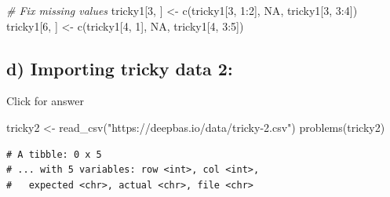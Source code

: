 \documentclass[
]{book}
\newenvironment{Shaded}{\begin{snugshade}}{\end{snugshade}}
\newcommand{\CommentTok}[1]{\textcolor[rgb]{0.56,0.35,0.01}{\textit{#1}}}
\newcommand{\ConstantTok}[1]{\textcolor[rgb]{0.00,0.00,0.00}{#1}}
\newcommand{\DecValTok}[1]{\textcolor[rgb]{0.00,0.00,0.81}{#1}}
\newcommand{\FunctionTok}[1]{\textcolor[rgb]{0.00,0.00,0.00}{#1}}
\newcommand{\NormalTok}[1]{#1}
\newcommand{\OtherTok}[1]{\textcolor[rgb]{0.56,0.35,0.01}{#1}}
\newcommand{\SpecialCharTok}[1]{\textcolor[rgb]{0.00,0.00,0.00}{#1}}
\newcommand{\StringTok}[1]{\textcolor[rgb]{0.31,0.60,0.02}{#1}}
\begin{document}
\begin{Shaded}
\begin{Highlighting}[]
\CommentTok{\# Fix missing values}
\NormalTok{tricky1[}\DecValTok{3}\NormalTok{, ] }\OtherTok{\textless{}{-}} \FunctionTok{c}\NormalTok{(tricky1[}\DecValTok{3}\NormalTok{, }\DecValTok{1}\SpecialCharTok{:}\DecValTok{2}\NormalTok{], }\ConstantTok{NA}\NormalTok{, tricky1[}\DecValTok{3}\NormalTok{, }\DecValTok{3}\SpecialCharTok{:}\DecValTok{4}\NormalTok{])}
\NormalTok{tricky1[}\DecValTok{6}\NormalTok{, ] }\OtherTok{\textless{}{-}} \FunctionTok{c}\NormalTok{(tricky1[}\DecValTok{4}\NormalTok{, }\DecValTok{1}\NormalTok{], }\ConstantTok{NA}\NormalTok{, tricky1[}\DecValTok{4}\NormalTok{, }\DecValTok{3}\SpecialCharTok{:}\DecValTok{5}\NormalTok{])}
\end{Highlighting}
\end{Shaded}

\hypertarget{d-importing-tricky-data-2}{%
\subsection{d) Importing tricky data 2:}\label{d-importing-tricky-data-2}}

Click for answer

\begin{Shaded}
\begin{Highlighting}[]
\NormalTok{tricky2 }\OtherTok{\textless{}{-}} \FunctionTok{read\_csv}\NormalTok{(}\StringTok{"https://deepbas.io/data/tricky{-}2.csv"}\NormalTok{)}
\FunctionTok{problems}\NormalTok{(tricky2)}
\end{Highlighting}
\end{Shaded}

\begin{verbatim}
# A tibble: 0 x 5
# ... with 5 variables: row <int>, col <int>,
#   expected <chr>, actual <chr>, file <chr>
\end{verbatim}
\end{document}
